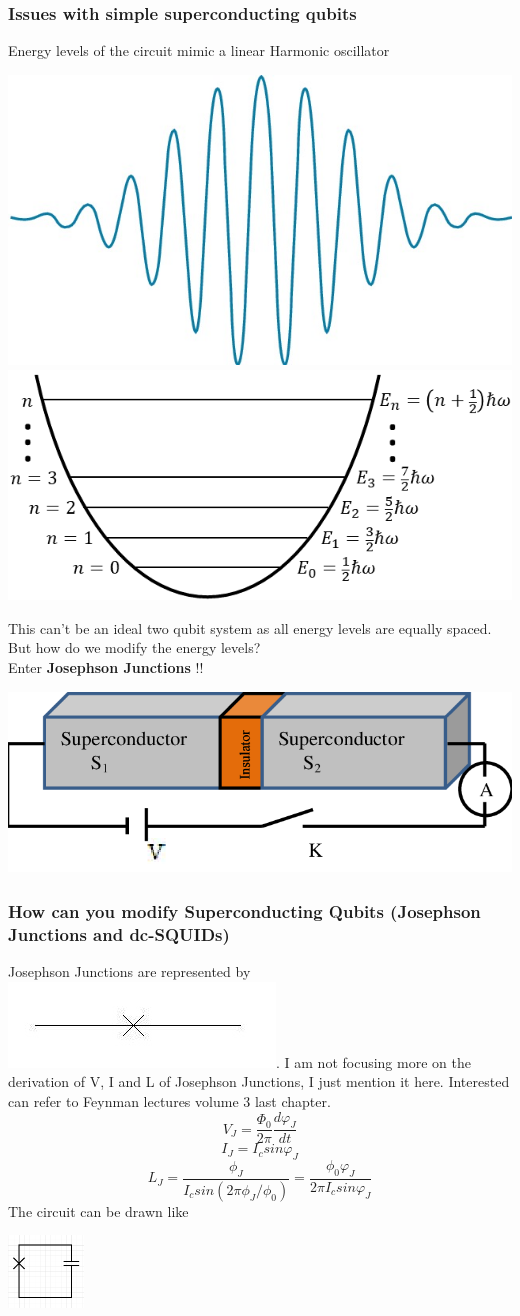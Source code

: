 \documentclass[11pt]{beamer}
\begin{document}
				\begin{frame}
			\frametitle{Issues with simple superconducting qubits}
			Energy levels of the circuit mimic a linear Harmonic oscillator
			\begin{center}
			\includegraphics[width=2 cm]{sc5.jpg}\includegraphics[width=5 cm]{sc4.png}
			\end{center}
			This can't be an ideal two qubit system as all energy levels are equally spaced. But how do we modify the energy levels?\\
			Enter \textbf{Josephson Junctions} !!
			\begin{center}
				\includegraphics[width=5 cm]{sc6.png}
			\end{center}

		\end{frame}
	
		\begin{frame}
		\frametitle{How can you modify Superconducting Qubits (Josephson Junctions and dc-SQUIDs)}
		Josephson Junctions are represented by \includegraphics[width=1 cm]{sc7.png}. I am not focusing more on the derivation of V, I and L of Josephson Junctions, I just mention it here. Interested can refer to Feynman lectures volume 3 last chapter.
		\[V_J=\frac{\Phi_0}{2\pi}\frac{d\varphi_J}{dt}\]
		\[I_J=I_c sin \varphi_J\]
		\[L_J=\frac{\phi_J}{I_csin(2\pi\phi_J/\phi_0)}=\frac{\phi_0\varphi_J}{2\pi I_c sin\varphi_J}\]
		The circuit can be drawn like\\
		\begin{center}
			\includegraphics[width=2cm]{sc8.png}
		\end{center}
	

	\end{frame}
	
\end{document}

